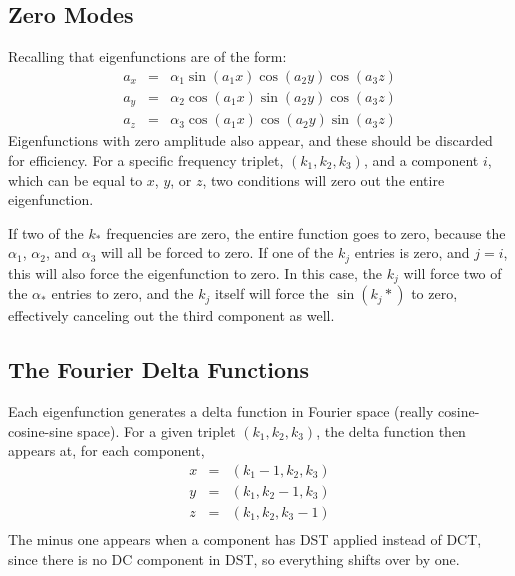 \documentclass[12pt,onecolumn]{article}
\begin{document}
\subsection{Zero Modes}

Recalling that eigenfunctions are of the form:
\begin{eqnarray*}
a_x &=& \alpha_1 \sin(a_1 x) \cos(a_2 y) \cos(a_3 z) \\
a_y &=& \alpha_2 \cos(a_1 x) \sin(a_2 y) \cos(a_3 z) \\
a_z &=& \alpha_3 \cos(a_1 x) \cos(a_2 y) \sin(a_3 z)
\end{eqnarray*}
Eigenfunctions with zero amplitude also appear, and these should be discarded for efficiency. For a specific frequency triplet, $(k_1, k_2, k_3)$, and a component $i$, which can be equal to $x$, $y$, or $z$, two conditions will zero out the entire eigenfunction.

If two of the $k_*$ frequencies are zero, the entire function goes to zero, because the $\alpha_1$, $\alpha_2$, and $\alpha_3$ will all be forced to zero. If one of the $k_j$ entries is zero, and $j = i$, this will also force the eigenfunction to zero. In this case, the $k_j$ will force two of the $\alpha_*$ entries to zero, and the $k_j$ itself will force the $\sin(k_j *)$ to zero, effectively canceling out the third component as well.

\subsection{The Fourier Delta Functions}

Each eigenfunction generates a delta function in Fourier space (really cosine-cosine-sine space). For a given triplet $(k_1, k_2, k_3)$, the delta function then appears at, for each component,
\begin{eqnarray*}
x &=& (k_1 - 1, k_2, k_3) \\
y &=& (k_1, k_2 - 1, k_3) \\
z &=& (k_1, k_2, k_3 - 1) \\
\end{eqnarray*}
The minus one appears when a component has DST applied instead of DCT, since there is no DC component in DST, so everything shifts over by one.
\end{document}
